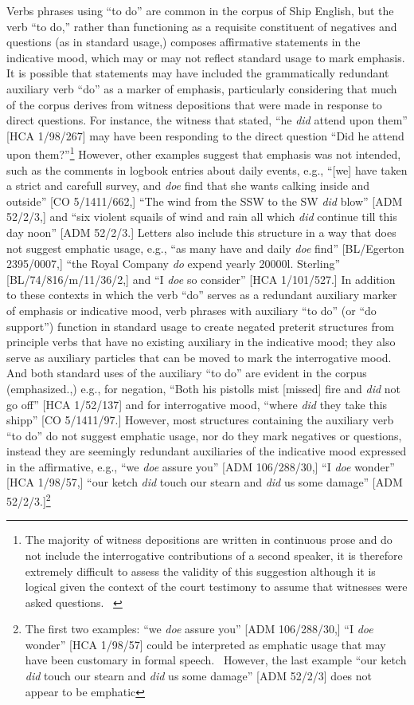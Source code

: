 \documentclass[12pt]{article}
\newenvironment{styleStandard}{\renewcommand\baselinestretch{1.0}\setlength\leftskip{0cm}\setlength\rightskip{0cm plus 1fil}\setlength\parindent{0cm}\setlength\parfillskip{0pt plus 1fil}\setlength\parskip{0in plus 1pt}\writerlistparindent\writerlistleftskip\leavevmode\normalfont\normalsize\writerlistlabel\ignorespaces}{\unskip\vspace{0in plus 1pt}\par}
\newcommand\writerlistleftskip{}
\newcommand\writerlistparindent{}
\newcommand\writerlistlabel{}
\begin{document}
\begin{styleStandard}
Verbs phrases using “to do” are common in the corpus of Ship English, but the verb “to do,” rather than functioning as a requisite constituent of negatives and questions (as in standard usage,) composes affirmative statements in the indicative mood, which may or may not reflect standard usage to mark emphasis. It is possible that statements may have included the grammatically redundant auxiliary verb “do” as a marker of emphasis, particularly considering that much of the corpus derives from witness depositions that were made in response to direct questions. For instance, the witness that stated, “he \textit{did} attend upon them” [HCA 1/98/267] may have been responding to the direct question “Did he attend upon them?”\footnote{ The majority of witness depositions are written in continuous prose and do not include the interrogative contributions of a second speaker, it is therefore extremely difficult to assess the validity of this suggestion although it is logical given the context of the court testimony to assume that witnesses were asked questions. \ } However, other examples suggest that emphasis was not intended, such as the comments in logbook entries about daily events, e.g., “[we] have taken a strict and carefull survey, and \textit{doe }find that she wants calking inside and outside” [CO 5/1411/662,] “The wind from the SSW to the SW \textit{did} blow” [ADM 52/2/3,] and “six violent squails of wind and rain all which \textit{did} continue till this day noon” [ADM 52/2/3.] Letters also include this structure in a way that does not suggest emphatic usage, e.g., “as many have and daily \textit{doe} find” [BL/Egerton 2395/0007,] “the Royal Company\textit{ do} expend yearly 20000l. Sterling” [BL/74/816/m/11/36/2,] and “I \textit{doe} so consider” [HCA 1/101/527.] In addition to these contexts in which the verb “do” serves as a redundant auxiliary marker of emphasis or indicative mood, verb phrases with auxiliary “to do” (or “do support”) function in standard usage to create negated preterit structures from principle verbs that have no existing auxiliary in the indicative mood; they also serve as auxiliary particles that can be moved to mark the interrogative mood. And both standard uses of the auxiliary “to do” are evident in the corpus (emphasized.,) e.g., for negation, “Both his pistolls mist [missed] fire and \textit{did} not go off” [HCA 1/52/137] and for interrogative mood, “where \textit{did} they take this shipp” [CO 5/1411/97.] However, most structures containing the auxiliary verb “to do” do not suggest emphatic usage, nor do they mark negatives or questions, instead they are seemingly redundant auxiliaries of the indicative mood expressed in the affirmative, e.g., “we \textit{doe} assure you” [ADM 106/288/30,] “I \textit{doe} wonder” [HCA 1/98/57,] “our ketch \textit{did }touch our stearn and \textit{did} us some damage” [ADM 52/2/3.]\footnote{ The first two examples: “we \textit{doe} assure you” [ADM 106/288/30,] “I \textit{doe} wonder” [HCA 1/98/57] could be interpreted as emphatic usage that may have been customary in formal speech. \ However, the last example “our ketch \textit{did }touch our stearn and \textit{did} us some damage” [ADM 52/2/3] does not appear to be emphatic 
\end{styleStandard}
\end{document}
